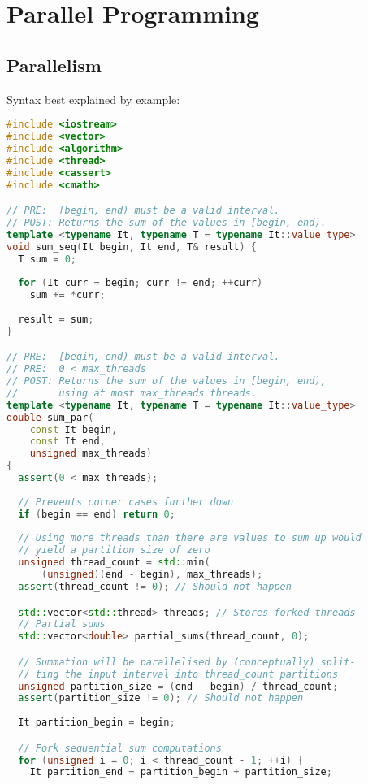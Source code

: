 \section{Parallel Programming}
\vspace{-4pt}
\begin{sectionbox}
\subsection{Parallelism}\smallskip
Syntax best explained by example: 
\end{sectionbox}
\vspace{-4pt}
\begin{lstlisting}[language=C++]
#include <iostream>
#include <vector>
#include <algorithm>
#include <thread>
#include <cassert>
#include <cmath>

// PRE:  [begin, end) must be a valid interval.
// POST: Returns the sum of the values in [begin, end).
template <typename It, typename T = typename It::value_type>
void sum_seq(It begin, It end, T& result) {
  T sum = 0;
  
  for (It curr = begin; curr != end; ++curr)
    sum += *curr;
    
  result = sum;
}

// PRE:  [begin, end) must be a valid interval.
// PRE:  0 < max_threads
// POST: Returns the sum of the values in [begin, end), 
//       using at most max_threads threads.
template <typename It, typename T = typename It::value_type>
double sum_par(
    const It begin, 
    const It end, 
    unsigned max_threads)
{
  assert(0 < max_threads);
  
  // Prevents corner cases further down
  if (begin == end) return 0; 
  
  // Using more threads than there are values to sum up would 
  // yield a partition size of zero
  unsigned thread_count = std::min(
      (unsigned)(end - begin), max_threads);
  assert(thread_count != 0); // Should not happen

  std::vector<std::thread> threads; // Stores forked threads
  // Partial sums
  std::vector<double> partial_sums(thread_count, 0);

  // Summation will be parallelised by (conceptually) split-
  // ting the input interval into thread_count partitions
  unsigned partition_size = (end - begin) / thread_count;
  assert(partition_size != 0); // Should not happen
  
  It partition_begin = begin;

  // Fork sequential sum computations
  for (unsigned i = 0; i < thread_count - 1; ++i) {
    It partition_end = partition_begin + partition_size;
    

\end{lstlisting}
